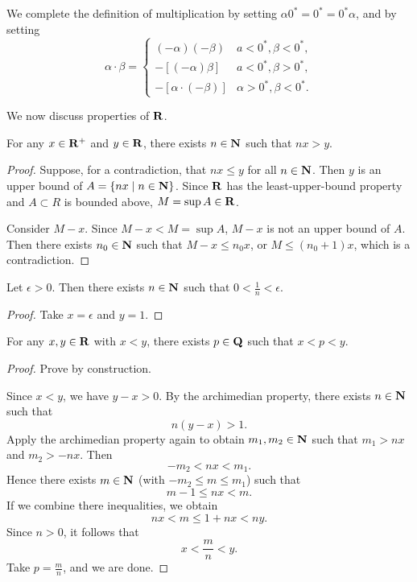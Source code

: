 We complete the definition of multiplication by setting $\alpha0^*=0^*=0^*\alpha$, and by setting
\[\alpha\cdot\beta=\begin{cases}
(-\alpha)(-\beta)&a<0^*,\beta<0^*,\\
-[(-\alpha)\beta]&a<0^*,\beta>0^*,\\
-[\alpha\cdot(-\beta)]&\alpha>0^*,\beta<0^*.
\end{cases}\]
\pagebreak

We now discuss properties of $\RR$.

\begin{theorem}[$\RR$ is archimedian]\label{thrm:r-archimedian}
For any $x\in\mathbf R^+$ and $y\in\mathbf R$, there exists $n\in\mathbf N$ such that $nx>y$.
\end{theorem}

\begin{proof}
Suppose, for a contradiction, that $nx\le y$ for all $n\in\mathbf N$. Then $y$ is an upper bound of $A=\{nx\mid n\in\mathbf N\}$. Since $\RR$ has the least-upper-bound property and $A\subset R$ is bounded above, $M=\sup A\in\mathbf R$.

Consider $M-x$. Since $M-x<M=\sup A$, $M-x$ is not an upper bound of $A$. Then there exists $n_0\in\mathbf N$ such that $M-x\le n_0x$, or $M\le(n_0+1)x$, which is a contradiction.
\end{proof}

\begin{corollary}
Let $\epsilon>0$. Then there exists $n\in\mathbf N$ such that $0<\frac{1}{n}<\epsilon$.
\end{corollary}

\begin{proof}
Take $x=\epsilon$ and $y=1$.
\end{proof}

\begin{theorem}[$\QQ$ is dense in $\RR$]
For any $x,y\in\mathbf R$ with $x<y$, there exists $p\in\mathbf Q$ such that $x<p<y$.
\end{theorem}

\begin{proof}
Prove by construction.

Since $x<y$, we have $y-x>0$. By the archimedian property, there exists $n\in\mathbf N$ such that
\[n(y-x)>1.\]
Apply the archimedian property again to obtain $m_1,m_2\in\mathbf N$ such that $m_1>nx$ and $m_2>-nx$. Then
\[-m_2<nx<m_1.\]
Hence there exists $m\in\mathbf N$ (with $-m_2\le m\le m_1$) such that
\[m-1\le nx<m.\]
If we combine there inequalities, we obtain
\[nx<m\le1+nx<ny.\]
Since $n>0$, it follows that
\[x<\frac{m}{n}<y.\]
Take $p=\frac{m}{n}$, and we are done.
\end{proof}

